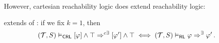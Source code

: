 However, cartesian reachability logic does extend reachability logic:
\begin{remark}
 extends  of :
if we fix $k=1$, then
\begin{align*}
    (\mathcal{T}, S) \vDash_{\mathsf{CRL}}
    [\varphi] \land \top  \Rightarrow^{c\exists}
    [\varphi^\prime] \land \top
    \iff
    (\mathcal{T}, S) \vDash_{\mathsf{RL}} \varphi \Rightarrow^{\exists} \varphi^\prime \, .
\end{align*}
\end{remark}




